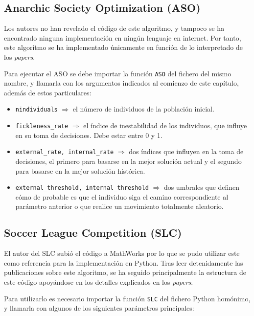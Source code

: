 \subsection{Anarchic Society Optimization (ASO)}

Los autores no han revelado el código de este algoritmo, y tampoco se ha encontrado ninguna implementación en ningún lenguaje en internet. Por tanto, este algoritmo se ha implementado únicamente en función de lo interpretado de los \textit{papers}.

Para ejecutar el ASO se debe importar la función \texttt{ASO} del fichero del mismo nombre, y llamarla con los argumentos indicados al comienzo de este capítulo, además de estos particulares:

\begin{itemize}
	\item \texttt{nindividuals} $\Rightarrow$ el número de individuos de la población inicial.
	\item \texttt{fickleness\_rate} $\Rightarrow$ el índice de inestabilidad de los individuos, que influye en su toma de decisiones. Debe estar entre 0 y 1.
	\item \texttt{external\_rate, internal\_rate} $\Rightarrow$ dos índices que influyen en la toma de decisiones, el primero para basarse en la mejor solución actual y el segundo para basarse en la mejor solución histórica.
	\item \texttt{external\_threshold, internal\_threshold} $\Rightarrow$ dos umbrales que definen cómo de probable es que el individuo siga el camino correspondiente al parámetro anterior o que realice un movimiento totalmente aleatorio.
\end{itemize}

\subsection{Soccer League Competition (SLC)}

El autor del SLC subió el código a MathWorks \cite{slc-matlab} por lo que se pudo utilizar este como referencia para la implementación en Python. Tras leer detenidamente las publicaciones sobre este algoritmo, se ha seguido principalmente la estructura de este código apoyándose en los detalles explicados en los \textit{papers}.

Para utilizarlo es necesario importar la función \texttt{SLC} del fichero Python homónimo, y llamarla con algunos de los siguientes parámetros principales:

